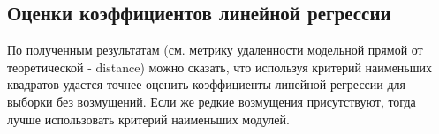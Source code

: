 \subsection{Оценки коэффициентов линейной регрессии}
	
	По полученным результатам (см. метрику удаленности модельной прямой от теоретической - distance) можно сказать, что используя критерий наименьших квадратов удастся точнее оценить коэффициенты линейной регрессии для выборки без возмущений. Если же редкие возмущения присутствуют, тогда лучше использовать критерий наименьших модулей.